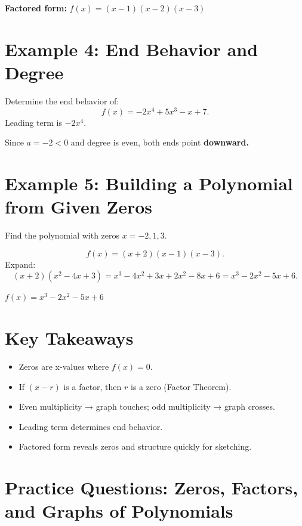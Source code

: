 \documentclass[14pt]{extarticle}
\begin{document}
\textbf{Factored form:} \(\boxed{f(x) = (x - 1)(x - 2)(x - 3)}\)

\section*{Example 4: End Behavior and Degree}

Determine the end behavior of:
\[
f(x) = -2x^4 + 5x^3 - x + 7.
\]
Leading term is \(-2x^4.\)

Since \(a = -2 < 0\) and degree is even,  
both ends point \textbf{downward.}

\section*{Example 5: Building a Polynomial from Given Zeros}

Find the polynomial with zeros \(x = -2, 1, 3.\)

\[
f(x) = (x + 2)(x - 1)(x - 3).
\]
Expand:
\[
(x + 2)(x^2 - 4x + 3) = x^3 - 4x^2 + 3x + 2x^2 - 8x + 6 = x^3 - 2x^2 - 5x + 6.
\]

\(\boxed{f(x) = x^3 - 2x^2 - 5x + 6}\)

\section*{Key Takeaways}
\begin{itemize}
  \item Zeros are x-values where \(f(x) = 0.\)
  \item If \((x - r)\) is a factor, then \(r\) is a zero (Factor Theorem).
  \item Even multiplicity → graph touches; odd multiplicity → graph crosses.
  \item Leading term determines end behavior.
  \item Factored form reveals zeros and structure quickly for sketching.
\end{itemize}

\newpage


\section*{Practice Questions: Zeros, Factors, and Graphs of Polynomials}
\end{document}
